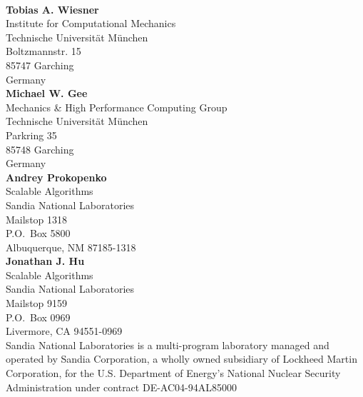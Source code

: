 \documentclass[10pt,fleqn]{book}
\begin{document}

\newpage
~\vfill
\thispagestyle{empty}

\noindent \textbf{Tobias A. Wiesner}  \\
Institute for Computational Mechanics \\
Technische Universit\"at M\"unchen  \\
Boltzmannstr. 15 \\
85747 Garching\\
Germany\\

\noindent \textbf{Michael W. Gee}\\
Mechanics \& High Performance Computing Group \\
Technische Universit\"at M\"unchen  \\
Parkring 35 \\
85748 Garching\\
Germany\\

\noindent \textbf{Andrey Prokopenko} \\
Scalable Algorithms \\
Sandia National Laboratories\\
Mailstop 1318 \\
P.O.~Box 5800 \\
Albuquerque, NM 87185-1318\\

\noindent \textbf{Jonathan J. Hu} \\
Scalable Algorithms \\
Sandia National Laboratories\\
Mailstop 9159 \\
P.O.~Box 0969 \\
Livermore, CA 94551-0969\\

\noindent Sandia National Laboratories is a multi-program laboratory managed
and operated by Sandia Corporation, a wholly owned subsidiary of Lockheed
Martin Corporation, for the U.S. Department of Energy's National Nuclear
Security Administration under contract DE-AC04-94AL85000

%
%
\end{document}
